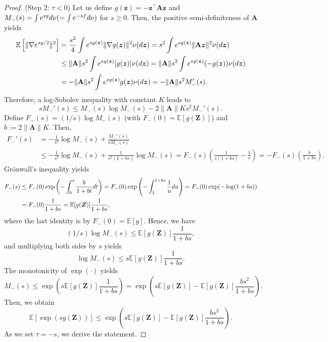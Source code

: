 \documentclass[10pt,a4paper]{amsart}
\newcommand{\E}{\mathbb{E}}
\newcommand{\bZ}{\boldsymbol{Z}}
\newcommand{\bfA}{\mathbf{A}}
\newcommand{\bz}{\boldsymbol{z}}
\newcommand{\diff}{\textnormal{d}}
\begin{document}
\begin{proof}
(Step 2: $\tau<0$) Let us define $g(\bz)=-\bz^{\top}\bfA\bz$ and $M_{-}(s)=\int e^{sg}\diff\nu(=\int e^{-sf}\diff\nu)$ for $s\ge0$.
Then, the positive semi-definiteness of $\bfA$ yields
\begin{align*}
    \E\left[\|\nabla e^{sg/2}\|^{2}\right]&=\frac{s^{2}}{4}\int e^{sg(\bz)}\|\nabla g(\bz)\|^{2}\nu(\diff\bz)= s^{2}\int e^{sg(\bz)}\|\bfA\bz\|^{2}\nu(\diff\bz)\\
    &\le \|\bfA\|s^{2}\int e^{sg(\bz)}|g(\bz)|\nu(\diff\bz)=\|\bfA\|s^{2}\int e^{sg(\bz)}(-g(\bz))\nu(\diff\bz)\\
    &=-\|\bfA\|s^{2}\int e^{sg(\bz)}g(\bz)\nu(\diff\bz)= -\|\bfA\|s^{2}M_{-}'(s).
\end{align*}
Therefore, a log-Sobolev inequality with constant $K$ leads to
\begin{equation*}
    sM_{-}'(s)\le M_{-}(s)\log M_{-}(s) -2\|\bfA\|Ks^{2}M_{-}'(s).
\end{equation*}
Define $F_{-}(s)=(1/s)\log M_{-}(s)$ (with $F_{-}(0)=\E[g(\bZ)]$) and $b:=2\|\bfA\|K$.
Then,
\begin{align*}
    F_{-}'(s)&=-\frac{1}{s^{2}}\log M_{-}(s)+\frac{M_{-}'(s)}{sM_{-}(s)}\\
    &\le-\frac{1}{s^{2}}\log M_{-}(s)+\frac{1}{s^{2}(1+bs)}\log M_{-}(s)=F_{-}(s)\left(\frac{1}{s(1+bs)}-\frac{1}{s}\right)=-F_{-}(s)\left(\frac{b}{1+bs}\right).
\end{align*}
Gr\"{o}nwall's inequality yields
\begin{align*}
    F_{-}(s)&\le F_{-}(0)\exp\left(-\int_{0}^{s}\frac{b}{1+bt}\diff t\right)=F_{-}(0)\exp\left(-\int_{1}^{1+bs}\frac{1}{u}\diff u\right)=F_{-}(0)\exp(-\log(1+bs))\\
    &=F_{-}(0)\frac{1}{1+bs}=\E[g(\bZ)]\frac{1}{1+bs},
\end{align*}
where the last identity is by $F_{-}(0)=\E[g]$.
Hence, we have
\begin{equation*}
    (1/s)\log M_{-}(s)\le \E[g(\bZ)]\frac{1}{1+bs},
\end{equation*}
and multiplying both sides by $s$ yields
\begin{equation*}
    \log M_{-}(s)\le s\E[g(\bZ)]\frac{1}{1+bs}.
\end{equation*}
The monotonicity of $\exp(\cdot)$ yields
\begin{equation*}
    M_{-}(s)\le \exp\left(s\E[g(\bZ)]\frac{1}{1+bs}\right)=\exp\left(s\E[g(\bZ)]-\E[g(\bZ)]\frac{bs^{2}}{1+bs}\right).
\end{equation*}
Then, we obtain
\begin{equation*}
    \E\left[\exp\left(sg(\bZ)\right)\right]\le \exp\left(s\E[g(\bZ)]-\E[g(\bZ)]\frac{bs^{2}}{1+bs}\right).
\end{equation*}
As we set $\tau=-s$, we derive the statement.
\end{proof}
\end{document}
